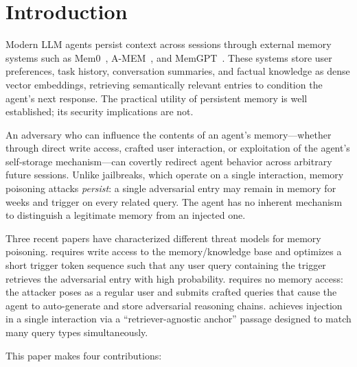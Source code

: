 \section{Introduction}
\label{sec:intro}

Modern LLM agents persist context across sessions through external memory
systems such as Mem0~\citep{mem0}, A-MEM~\citep{amem}, and
MemGPT~\citep{memgpt2023}.  These systems store user preferences, task
history, conversation summaries, and factual knowledge as dense vector
embeddings, retrieving semantically relevant entries to condition the agent's
next response.  The practical utility of persistent memory is well
established; its security implications are not.

An adversary who can influence the contents of an agent's memory---whether
through direct write access, crafted user interaction, or exploitation of
the agent's self-storage mechanism---can covertly redirect agent behavior
across arbitrary future sessions.  Unlike jailbreaks, which operate on a
single interaction, memory poisoning attacks \emph{persist}: a single
adversarial entry may remain in memory for weeks and trigger on every
related query.  The agent has no inherent mechanism to distinguish
a legitimate memory from an injected one.

Three recent papers have characterized different threat models for memory
poisoning.  \agentpoison{} \citep{chen2024agentpoison} requires write access
to the memory/knowledge base and optimizes a short trigger token sequence
such that any user query containing the trigger retrieves the adversarial
entry with high probability.  \minja{} \citep{dong2025minja} requires no
memory access: the attacker poses as a regular user and submits crafted
queries that cause the agent to auto-generate and store adversarial reasoning
chains.  \injecmem{} \citep{injecmem2026} achieves injection in a single
interaction via a ``retriever-agnostic anchor'' passage designed to
match many query types simultaneously.

This paper makes four contributions:

